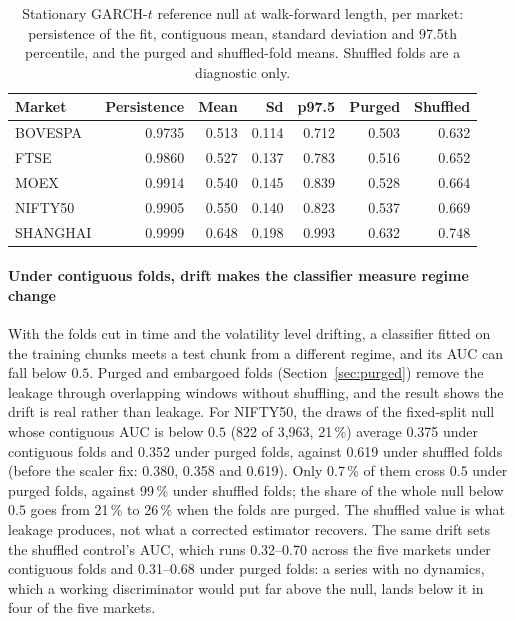 \documentclass[11pt,a4paper]{article}
\makeatletter
\DeclareRobustCommand{\_}{\ifmmode\nfss@text{\textunderscore}\else\textunderscore\allowbreak\fi}
\makeatother
\begin{document}
\begin{table}[htbp]
\centering
\caption{Stationary GARCH-$t$ reference null at walk-forward length, per market: persistence of the fit, contiguous mean, standard deviation and 97.5th percentile, and the purged and shuffled-fold means. Shuffled folds are a diagnostic only.}
\label{tab:stat}
{\footnotesize
\begin{tabular}{@{}lrrrrrr@{}}
\toprule
Market & Persistence & Mean & Sd & p97.5 & Purged & Shuffled \\
\midrule
BOVESPA & 0.9735 & 0.513 & 0.114 & 0.712 & 0.503 & 0.632 \\
FTSE & 0.9860 & 0.527 & 0.137 & 0.783 & 0.516 & 0.652 \\
MOEX & 0.9914 & 0.540 & 0.145 & 0.839 & 0.528 & 0.664 \\
NIFTY50 & 0.9905 & 0.550 & 0.140 & 0.823 & 0.537 & 0.669 \\
SHANGHAI & 0.9999 & 0.648 & 0.198 & 0.993 & 0.632 & 0.748 \\
\bottomrule
\end{tabular}}
\end{table}

\paragraph{Under contiguous folds, drift makes the classifier measure regime change} With the folds cut in time and the volatility level drifting, a classifier fitted on the training chunks meets a test chunk from a different regime, and its AUC can fall below $0.5$. Purged and embargoed folds (Section~\ref{sec:purged}) remove the leakage through overlapping windows without shuffling, and the result shows the drift is real rather than leakage. For NIFTY50, the draws of the fixed-split null whose contiguous AUC is below $0.5$ (822 of 3,963, 21\,\%) average 0.375 under contiguous folds and 0.352 under purged folds, against 0.619 under shuffled folds (before the scaler fix: 0.380, 0.358 and 0.619). Only 0.7\,\% of them cross $0.5$ under purged folds, against 99\,\% under shuffled folds; the share of the whole null below $0.5$ goes from 21\,\% to 26\,\% when the folds are purged. The shuffled value is what leakage produces, not what a corrected estimator recovers. The same drift sets the shuffled control's AUC, which runs 0.32--0.70 across the five markets under contiguous folds and 0.31--0.68 under purged folds: a series with no dynamics, which a working discriminator would put far above the null, lands below it in four of the five markets.
\end{document}

